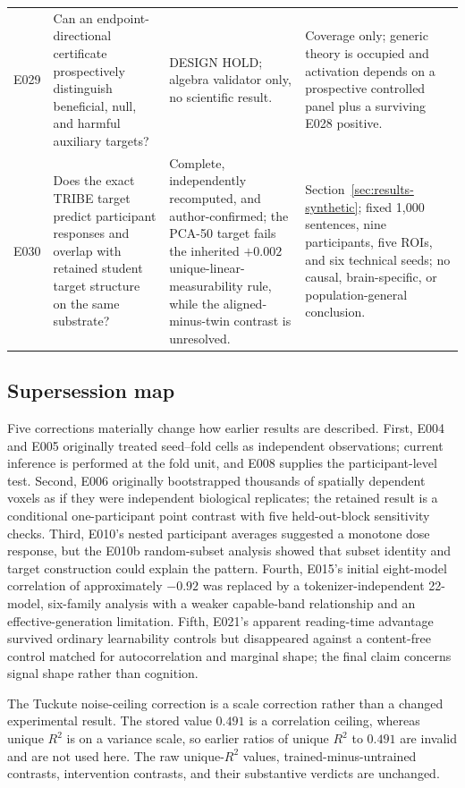 \begin{longtable}{p{}p{}p{}p{}}
E029 & Can an endpoint-directional certificate prospectively distinguish beneficial, null, and harmful auxiliary targets? & DESIGN HOLD; algebra validator only, no scientific result. & Coverage only; generic theory is occupied and activation depends on a prospective controlled panel plus a surviving E028 positive. \\
E030 & Does the exact TRIBE target predict participant responses and overlap with retained student target structure on the same substrate? & Complete, independently recomputed, and author-confirmed; the PCA-50 target fails the inherited $+0.002$ unique-linear-measurability rule, while the aligned-minus-twin contrast is unresolved. & Section~\ref{sec:results-synthetic}; fixed 1,000 sentences, nine participants, five ROIs, and six technical seeds; no causal, brain-specific, or population-general conclusion. \\
\bottomrule
\end{longtable}
\endgroup

\subsection{Supersession map}

Five corrections materially change how earlier results are described.
First, E004 and E005 originally treated seed--fold cells as independent observations; current inference is performed at the fold unit, and E008 supplies the participant-level test.
Second, E006 originally bootstrapped thousands of spatially dependent voxels as if they were independent biological replicates; the retained result is a conditional one-participant point contrast with five held-out-block sensitivity checks.
Third, E010's nested participant averages suggested a monotone dose response, but the E010b random-subset analysis showed that subset identity and target construction could explain the pattern.
Fourth, E015's initial eight-model correlation of approximately $-0.92$ was replaced by a tokenizer-independent 22-model, six-family analysis with a weaker capable-band relationship and an effective-generation limitation.
Fifth, E021's apparent reading-time advantage survived ordinary learnability controls but disappeared against a content-free control matched for autocorrelation and marginal shape; the final claim concerns signal shape rather than cognition.

The Tuckute noise-ceiling correction is a scale correction rather than a changed experimental result.
The stored value $0.491$ is a correlation ceiling, whereas unique $R^2$ is on a variance scale, so earlier ratios of unique $R^2$ to $0.491$ are invalid and are not used here. 
The raw unique-$R^2$ values, trained-minus-untrained contrasts, intervention contrasts, and their substantive verdicts are unchanged.
